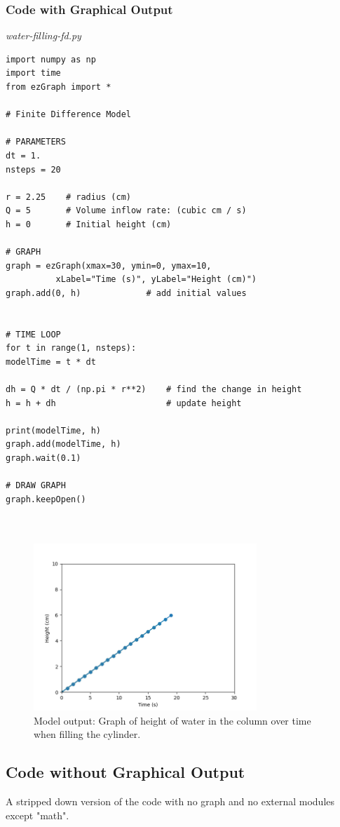 \documentclass[11pt,fleqn]{article}
\begin{document}
	\subsubsection{Code with Graphical Output}
	\textit{water-filling-fd.py}
\begin{lstlisting}[frame=single]
import numpy as np 
import time 
from ezGraph import *

# Finite Difference Model

# PARAMETERS
dt = 1.
nsteps = 20

r = 2.25    # radius (cm)
Q = 5       # Volume inflow rate: (cubic cm / s)
h = 0       # Initial height (cm)

# GRAPH
graph = ezGraph(xmax=30, ymin=0, ymax=10, 
          xLabel="Time (s)", yLabel="Height (cm)")
graph.add(0, h)             # add initial values


# TIME LOOP
for t in range(1, nsteps):
modelTime = t * dt

dh = Q * dt / (np.pi * r**2)    # find the change in height
h = h + dh                      # update height

print(modelTime, h)
graph.add(modelTime, h)
graph.wait(0.1)

# DRAW GRAPH
graph.keepOpen()
	
	
\end{lstlisting}
	
	\begin{figure} 
		\caption{Model output: Graph of height of water in the column over time when filling the cylinder.}
		\centering
		\label{fillingModel}
		\includegraphics[width=0.75\textwidth]{water-filling-fd.png}
	\end{figure}
	
	\subsection{Code without Graphical Output}
	A stripped down version of the code with no graph and no external modules except "math".
	
\end{document}

